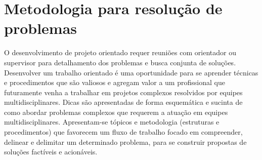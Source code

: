\graphicspath{{figuras/}}


\chapter{Metodologia para resolução de problemas}
\label{cap4}

O desenvolvimento de projeto orientado requer reuniões com orientador ou supervisor para detalhamento dos problemas e busca conjunta de soluções. Desenvolver um trabalho orientado é uma oportunidade para se aprender técnicas e procedimentos que são valiosos e agregam valor a um profissional que futuramente venha a trabalhar em projetos complexos resolvidos por equipes multidisciplinares.  Dicas são apresentadas de forma esquemática e sucinta de como abordar problemas complexos que requerem a atuação em  equipes multidisciplinares. Apresentam-se tópicos e metodologia (estruturas e procedimentos) que favorecem um  fluxo de trabalho focado em compreender, delinear e delimitar um determinado problema, para se construir propostas de soluções factíveis e acionáveis.


